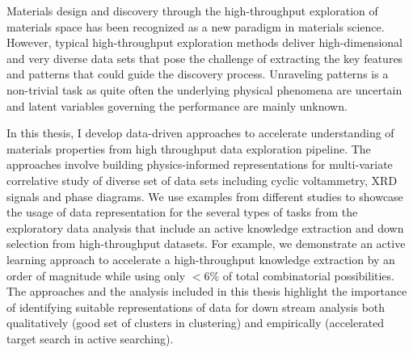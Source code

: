 Materials design and discovery through the high-throughput exploration of materials space has been recognized as a new paradigm in materials science. 
However, typical high-throughput exploration methods deliver high-dimensional and very diverse data sets that pose the challenge of extracting the key features and patterns that could guide the discovery process. 
Unraveling patterns is a non-trivial task as quite often the underlying physical phenomena are uncertain and latent variables governing the performance are mainly unknown. 

In this thesis, I develop data-driven approaches to accelerate understanding of materials properties from high throughput data exploration pipeline.
The approaches involve building physics-informed representations for multi-variate correlative study of diverse set of data sets including cyclic voltammetry, XRD signals and phase diagrams. 
We use examples from different studies to showcase the usage of data representation for the several types of tasks from the exploratory data analysis that include an active knowledge extraction and down selection from high-throughput datasets. 
For example, we demonstrate an active learning approach to accelerate a high-throughput knowledge extraction by an order of magnitude while using only \(<6\%\) of total combinatorial possibilities. 
The approaches and the analysis included in this thesis highlight the importance of identifying suitable representations of data for down stream analysis both qualitatively (good set of clusters in clustering) and empirically (accelerated target search in active searching). 



